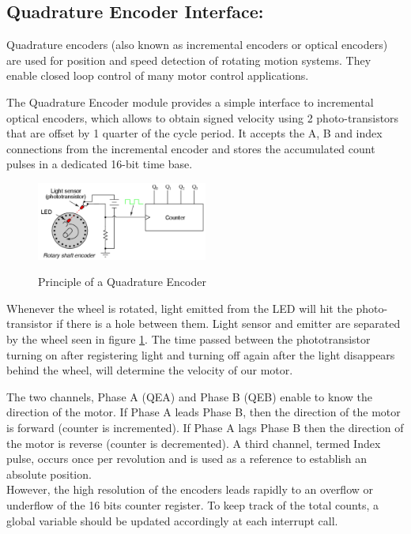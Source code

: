 \subsection{Quadrature Encoder Interface:}

Quadrature encoders (also known as incremental encoders or optical encoders) are used for position and speed detection of rotating motion systems. They enable closed loop control of many motor control applications.

The Quadrature Encoder module provides a simple interface to incremental optical encoders, which allows to obtain signed velocity using 2 photo-transistors that are offset by 1 quarter of the cycle period. It accepts the A, B and index connections from the incremental encoder and stores the accumulated count pulses in a dedicated 16-bit time base.

\begin{figure}
    \caption{Principle of a Quadrature Encoder \cite{alex}}
        \centering
            \includegraphics[width=0.5\textwidth]{figures/software/qei_demo.png}
            \label{fig:qei_demo}
\end{figure}

Whenever the wheel is rotated, light emitted from the LED will hit the photo-transistor if there is a hole between them. Light sensor and emitter are separated by the wheel seen in figure \ref{fig:qei_demo}. The time passed between the phototransistor turning on after registering light and turning off again after the light disappears behind the wheel, will determine the velocity of our motor.

The two channels, Phase A (QEA) and Phase B (QEB) enable to know the direction of the motor. If Phase A leads Phase B, then the direction of the motor is forward (counter is incremented). If Phase A lags Phase B then the direction of the motor is reverse (counter is decremented). A third channel, termed Index pulse, occurs once per revolution and is used as a reference to establish an absolute position.\\
However, the high resolution of the encoders leads rapidly to an overflow or underflow of the 16 bits counter register. To keep track of the total counts, a global variable should be updated accordingly at each interrupt call.

